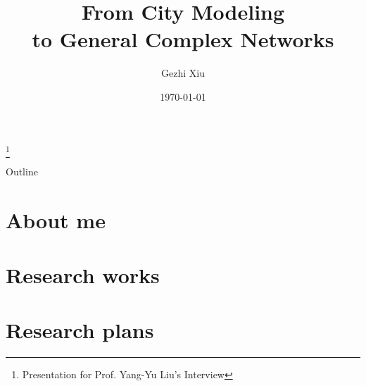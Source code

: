 \documentclass{beamer}
\title[Modeling Cities]{From City Modeling \\ to General Complex Networks\sm}
\author{Gezhi Xiu}
\institute{IRSGIS, Peking University}
\date{\today}
\begin{document}
\begin{frame}
  \titlepage
  \footnote{Presentation for Prof. Yang-Yu Liu's Interview}
\end{frame}

\begin{frame}{Outline}
 \tableofcontents
\end{frame}

\section{About me}


\section{Research works}


\section{Research plans}






\end{document}
